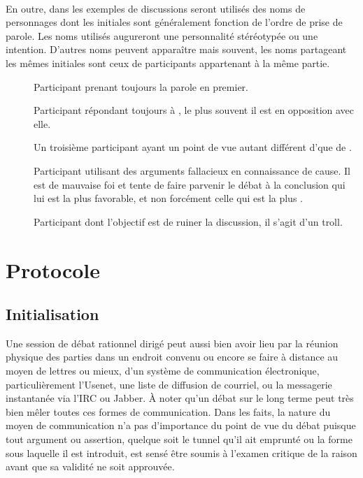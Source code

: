 \paragraph{}
En outre, dans les exemples de discussions seront utilisés des noms de personnages dont les initiales sont généralement fonction de l’ordre de prise de parole. Les noms utilisés augureront une personnalité stéréotypée ou une intention. D’autres noms peuvent apparaître mais souvent, les noms partageant les mêmes initiales sont ceux de participants appartenant à la même partie.

\begin{description}
  \item[\A] Participant prenant toujours la parole en premier.
  \item[\B] Participant répondant toujours à \A, le plus souvent il est en opposition avec elle.
  \item[\C] Un troisième participant ayant un point de vue autant différent d’\A que de \B.
  \item[\Sophist] Participant utilisant des arguments fallacieux en connaissance de cause. Il est de mauvaise foi et tente de faire parvenir le débat à la conclusion qui lui est la plus favorable, et non forcément celle qui est la plus .
  \item[\Troll] Participant dont l’objectif est de ruiner la discussion, il s’agit d’un troll.
\end{description}

\section{Protocole}
\subsection{Initialisation}
Une session de débat rationnel dirigé peut aussi bien avoir lieu par la réunion physique des parties dans un endroit convenu ou encore se faire à distance au moyen de lettres ou mieux, d’un système de communication électronique, particulièrement l’Usenet, une liste de diffusion de courriel, ou la messagerie instantanée via l’IRC ou Jabber. À noter qu’un débat sur le long terme peut très bien mêler toutes ces formes de communication. Dans les faits, la nature du moyen de communication n’a pas d’importance du point de vue du débat puisque tout argument ou assertion, quelque soit le tunnel qu’il ait emprunté ou la forme sous laquelle il est introduit, est sensé être soumis à l’examen critique de la raison avant que sa validité ne soit approuvée.

